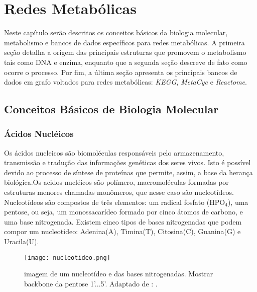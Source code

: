 \chapter{Redes Metabólicas}
 
\indent Neste capítulo serão descritos os conceitos básicos da biologia molecular, metabolismo e bancos de dados específicos para redes metabólicas. A primeira seção detalha a origem das principais estruturas que promovem o metabolismo tais como DNA e enzima, enquanto que a segunda seção descreve de fato como ocorre o processo. Por fim, a última seção apresenta os principais bancos de dados em grafo voltados para redes metabólicas: \textit{KEGG}, \textit{MetaCyc} e \textit{Reactome}.




\section{Conceitos Básicos de Biologia Molecular}


\subsection{Ácidos Nucléicos} \label{aceidosNucleicos}

\indent Os ácidos nucleicos são biomoléculas responsáveis pelo armazenamento, transmissão e tradução das informações genéticas dos seres vivos. Isto é possível devido ao processo de síntese de proteínas que permite, assim, a base da herança biológica.Os acidos nucléicos são polímero, macromoléculas formadas por estruturas menores chamadas monômeros, que nesse caso são nucleotídeos. Nucleotídeos são compostos de três elementos: um radical fosfato (HPO$_{4}$), uma pentose, ou seja, um monossacarídeo formado por cinco átomos de carbono, e uma base nitrogenada. Existem cinco tipos de bases nitrogenadas que podem compor um nucleotídeo: Adenina(A), Timina(T), Citosina(C), Guanina(G) e Uracila(U). \\

\begin{figure}[h]
    \centering
    \texttt{[image: nucleotideo.png]}
    \caption{imagem de um nucleotídeo e das bases nitrogenadas. Mostrar backbone da pentose 1'...5'. Adaptado de : \cite{dnadiscovery08}. }
    \label{fig:Nucleotideo}
\end{figure} 

